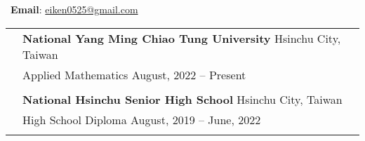 \documentclass[letterpaper, 11pt]{article}
\begin{document}


\vspace{0.5cm} 
\noindent\quad\ \textbf{Email}: \href{mailto:eiken0525@gmail.com}{eiken0525@gmail.com}


\setlength{\tabcolsep}{8pt}

\begin{longtable}{p{0.8in}p{5.5in}}




\color{OliveGreen}{Education} 
& \textbf{National Yang Ming Chiao Tung University} \hfill Hsinchu City, Taiwan \\ 
& Applied Mathematics \hfill August, 2022 -- Present \\
& \\

& \textbf{National Hsinchu Senior High School} \hfill Hsinchu City, Taiwan \\
& High School Diploma \hfill August, 2019 -- June, 2022\\
& \\




\end{longtable}
\end{document}
